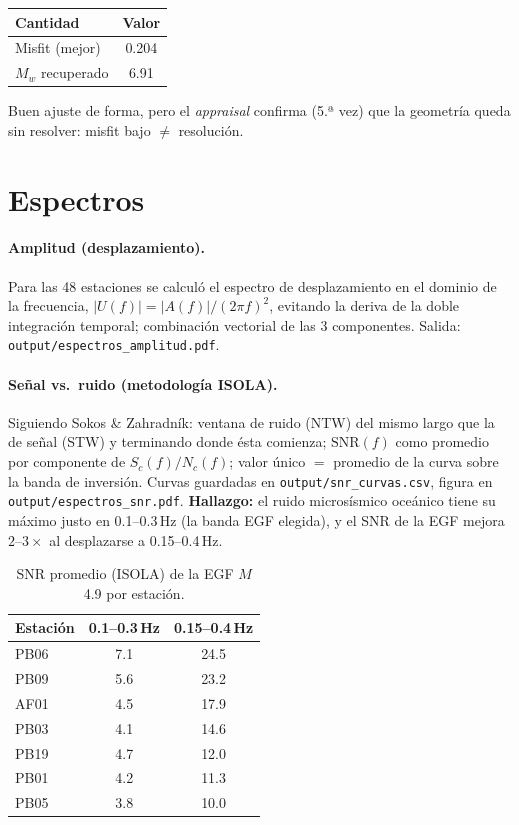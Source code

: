 \documentclass[11pt,a4paper]{article}
\newcommand{\Hz}{Hz}
\newcommand{\num}[1]{#1}
\newcommand{\SIrange}[3]{#1--#2\,#3}
\newcommand{\fn}[1]{\texttt{\small #1}}
\begin{document}
\begin{center}
\begin{tabular}{lc}
\toprule
Cantidad & Valor \\
\midrule
Misfit (mejor) & \num{0.204} \\
$M_w$ recuperado & \num{6.91} \\
\bottomrule
\end{tabular}
\end{center}

\noindent Buen ajuste de forma, pero el \emph{appraisal} confirma (5.ª vez)
que la geometría queda sin resolver: misfit bajo $\neq$ resolución.

\section{Espectros}
\paragraph{Amplitud (desplazamiento).} Para las 48 estaciones se calculó el
espectro de desplazamiento en el dominio de la frecuencia,
$|U(f)| = |A(f)|/(2\pi f)^2$, evitando la deriva de la doble integración
temporal; combinación vectorial de las 3 componentes. Salida:
\fn{output/espectros\_amplitud.pdf}.

\paragraph{Señal vs.\ ruido (metodología ISOLA).} Siguiendo Sokos \&
Zahradník: ventana de ruido (NTW) del mismo largo que la de señal (STW) y
terminando donde ésta comienza; $\mathrm{SNR}(f)$ como promedio por componente
de $S_c(f)/N_c(f)$; valor único $=$ promedio de la curva sobre la banda de
inversión. Curvas guardadas en \fn{output/snr\_curvas.csv}, figura en
\fn{output/espectros\_snr.pdf}. \textbf{Hallazgo:} el ruido microsísmico
oceánico tiene su máximo justo en \SIrange{0.1}{0.3}{\Hz} (la banda EGF
elegida), y el SNR de la EGF mejora $2$--$3\times$ al desplazarse a
\SIrange{0.15}{0.4}{\Hz}.

\begin{table}[h]
\centering
\caption{SNR promedio (ISOLA) de la EGF $M$4.9 por estación.}
\begin{tabular}{lcc}
\toprule
Estación & \SIrange{0.1}{0.3}{\Hz} & \SIrange{0.15}{0.4}{\Hz} \\
\midrule
PB06 & 7.1 & 24.5 \\
PB09 & 5.6 & 23.2 \\
AF01 & 4.5 & 17.9 \\
PB03 & 4.1 & 14.6 \\
PB19 & 4.7 & 12.0 \\
PB01 & 4.2 & 11.3 \\
PB05 & 3.8 & 10.0 \\
\bottomrule
\end{tabular}
\end{table}
\end{document}

